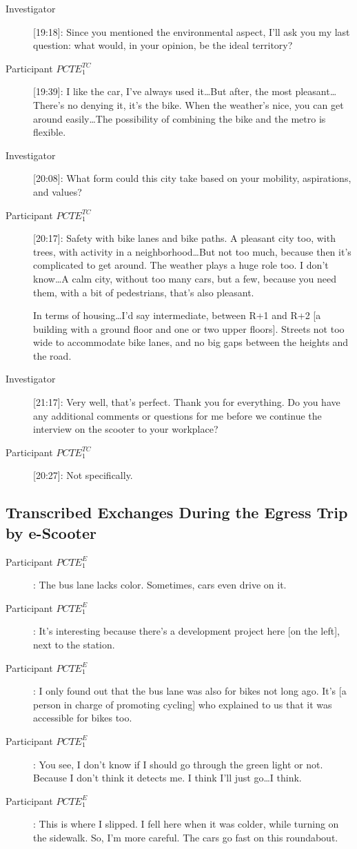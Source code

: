 \begin{description}
    \item[Investigator] [19:18]: Since you mentioned the environmental aspect, I’ll ask you my last question: what would, in your opinion, be the ideal territory?
    \item[Participant \(PCTE^{TC}_{1}\)] [19:39]: I like the car, I’ve always used it\dots But after, the most pleasant\dots There’s no denying it, it’s the bike. When the weather’s nice, you can get around easily\dots The possibility of combining the bike and the metro is flexible.
    \item[Investigator] [20:08]: What form could this city take based on your mobility, aspirations, and values?
    \item[Participant \(PCTE^{TC}_{1}\)] [20:17]: Safety with bike lanes and bike paths. A pleasant city too, with trees, with activity in a neighborhood\dots But not too much, because then it’s complicated to get around. The weather plays a huge role too. I don’t know\dots A calm city, without too many cars, but a few, because you need them, with a bit of pedestrians, that’s also pleasant.%

    In terms of housing\dots I’d say intermediate, between R+1 and R+2 [a building with a ground floor and one or two upper floors]. Streets not too wide to accommodate bike lanes, and no big gaps between the heights and the road.
    \item[Investigator] [21:17]: Very well, that’s perfect. Thank you for everything. Do you have any additional comments or questions for me before we continue the interview on the scooter to your workplace?
    \item[Participant \(PCTE^{TC}_{1}\)] [20:27]: Not specifically.
\end{description}%

\subsection{Transcribed Exchanges During the Egress Trip by e-Scooter}

\begin{description}
    \item[Participant \(PCTE^{E}_{1}\)]: The bus lane lacks color. Sometimes, cars even drive on it.
    \item[Participant \(PCTE^{E}_{1}\)]: It’s interesting because there’s a development project here [on the left], next to the station.
    \item[Participant \(PCTE^{E}_{1}\)]: I only found out that the bus lane was also for bikes not long ago. It’s [a person in charge of promoting cycling] who explained to us that it was accessible for bikes too.
    \item[Participant \(PCTE^{E}_{1}\)]: You see, I don’t know if I should go through the green light or not. Because I don’t think it detects me. I think I’ll just go\dots I think.
    \item[Participant \(PCTE^{E}_{1}\)]: This is where I slipped. I fell here when it was colder, while turning on the sidewalk. So, I’m more careful. The cars go fast on this roundabout.
\end{description}%

